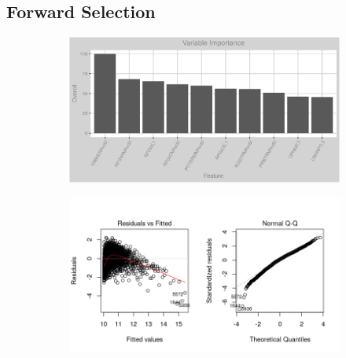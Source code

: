 \subsection{Forward Selection}
\label{appendix:electricity:lp}
\begin{figure}[h]
\centering
\begin{subfigure}{1\textwidth}
\centering
\includegraphics[width=.99\textwidth, height=0.35\textheight]{Images/electricity_psf_lp_vars.png}
\end{subfigure}
\begin{subfigure}{1\textwidth}
\centering
\includegraphics[width=.99\textwidth, height=0.4\textheight]{Images/electricity_psf_lp_res_1.png}
\end{subfigure}
\end{figure}
\FloatBarrier
\newpage
